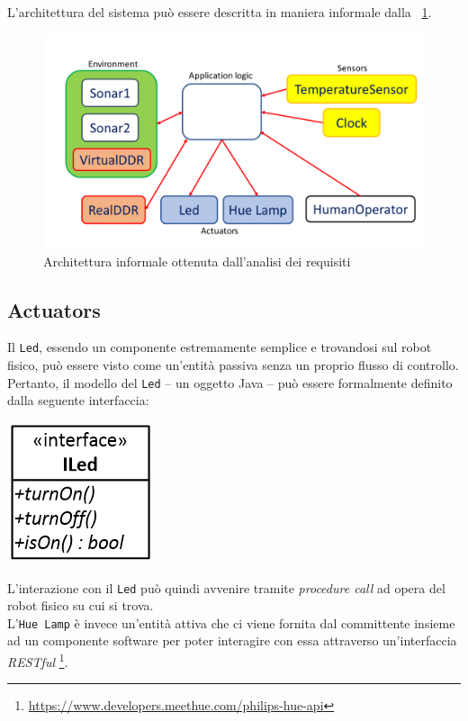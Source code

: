 \documentclass{../llncs}
\newcommand{\labelfig}[1]{\label{fig:#1}}
\newcommand{\xf}[1]{\figurename~\ref{fig:#1}}
\begin{document}
L'architettura del sistema può essere descritta in maniera informale dalla \xf{informalRA}.
\begin{figure}[!htb]
\centering
\includegraphics[scale=0.4]{img/informalReqAnalysis.png}
\caption{Architettura informale ottenuta dall'analisi dei requisiti}\labelfig{informalRA}
\end{figure}

\subsection{Actuators}
Il \texttt{Led}, essendo un componente estremamente semplice e trovandosi sul robot fisico, può essere visto come un'entità passiva senza un proprio flusso di controllo. Pertanto, il modello del \texttt{Led} -- un oggetto Java -- può essere formalmente definito dalla seguente interfaccia:

\begin{center}
\includegraphics[scale=0.4]{img/iled.png}
\end{center}

L'interazione con il \texttt{Led} può quindi avvenire tramite \textit{procedure call} ad opera del robot fisico su cui si trova.\\

L'\texttt{Hue Lamp} è invece un'entità attiva che ci viene fornita dal committente insieme ad un componente software per poter interagire con essa attraverso un'interfaccia \textit{RESTful}
\footnote{\url{https://www.developers.meethue.com/philips-hue-api}}.
\end{document}
